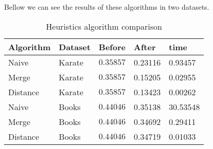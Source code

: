 \clearpage

Bellow we can see the results of these algorithms in two datasets.

\begin{table}[htbp]
 \centering
 \caption{Heuristics algorithm comparison}
 \label{tab:heuristics}
 \begin{tabular}{| l || l | l | l | l |}
 \hline
  Algorithm & Dataset & Before & After & time\\
  \hline
  \hline
  Naive & Karate & $0.35857$ & 0.23116 &  0.93457\\
  \hline
  Merge & Karate & $0.35857$ & 0.15205 &  0.02955\\
  \hline
  Distance & Karate & $0.35857$ & 0.13423 &  0.00262\\
  \hline
  \hline
  Naive & Books & $0.44046$ & 0.35138 &  30.53548\\
  \hline
  Merge & Books & $0.44046$ & 0.34692 &  0.29411\\
  \hline
  Distance & Books & $0.44046$ & 0.34719 &  0.01033\\
  \hline
 \end{tabular}
 
\end{table}

